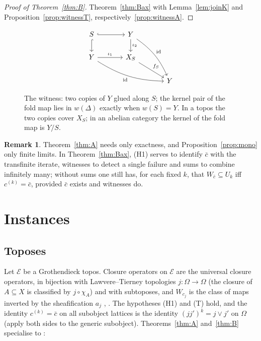 \documentclass[11pt]{amsart}
\theoremstyle{definition}
\newtheorem{rem}[thm]{Remark}
\newcommand{\cE}{\mathcal E}
\begin{document}
\begin{proof}[Proof of Theorem~\ref{thm:B}]
Theorem~\ref{thm:Bax} with Lemma~\ref{lem:joinK} and
Proposition~\ref{prop:witnessT}, respectively~\ref{prop:witnessA}.
\end{proof}

\begin{figure}[ht]
\[
\begin{tikzcd}[column sep=large]
S\arrow[r,hook]\arrow[d,hook] & Y\arrow[d,"\iota_2"]\arrow[ddr,bend left=15,"\mathrm{id}"]\\
Y\arrow[r,"\iota_1"]\arrow[drr,bend right=15,"\mathrm{id}"'] & X_S\arrow[dr,"f_S"]\\
& & Y
\end{tikzcd}
\]
\caption{The witness: two copies of $Y$ glued along $S$; the kernel pair
of the fold map lies in $w(\Delta)$ exactly when $w(S)=Y$. In a topos the
two copies cover $X_S$; in an abelian category the kernel of the fold map is
$Y/S$.}
\end{figure}

\begin{rem}\label{rem:elem}
Theorem~\ref{thm:A} needs only exactness, and Proposition~\ref{prop:mono}
only finite limits. In Theorem~\ref{thm:Bax}, (H1) serves to identify
$\bar c$ with the transfinite iterate, witnesses to detect a single failure
and sums to combine infinitely many; without sums one still has, for each
fixed $k$, that $W_{\bar c}\subseteq U_k$ iff $c^{(k)}=\bar c$, provided
$\bar c$ exists and witnesses do.
\end{rem}

\section{Instances}\label{sec:instances}

\subsection{Toposes}\label{sub:topos}
Let $\cE$ be a Grothendieck topos. Closure operators on $\cE$ are the
universal closure operators, in bijection with Lawvere--Tierney topologies
$j\colon\Omega\to\Omega$ (the closure of $A\subseteq X$ is classified by
$j\circ\chi_A$) and with subtoposes, and $W_{c_j}$ is the class of maps
inverted by the sheafification $a_j$ \cite[V.1]{MLM}, \cite[A4.3]{Elephant}.
The hypotheses (H1) and (T) hold, and the identity $c^{(k)}=\bar c$ on all
subobject lattices is the identity $(jj')^k=j\vee j'$ on $\Omega$ (apply
both sides to the generic subobject). Theorems~\ref{thm:A} and~\ref{thm:B}
specialise to \cite[Thms.~1.1, 1.2]{Stabjoin}:
\end{document}
